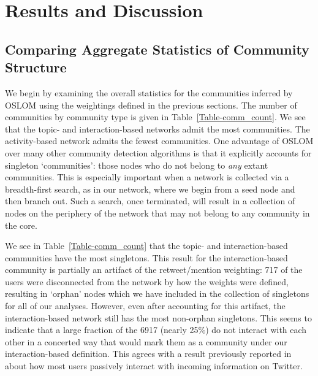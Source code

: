 \section{Results and Discussion}

\subsection{Comparing Aggregate Statistics of Community Structure}

We begin by examining the overall statistics for the communities inferred by OSLOM using the weightings defined in the previous sections. The number of communities by community type is given in Table~\ref{Table-comm_count}. We see that the topic- and interaction-based networks admit the most communities. The activity-based network admits the fewest communities.  One advantage of OSLOM over many other community detection algorithms is that it explicitly accounts for singleton `communities': those nodes who do not belong to \emph{any} extant communities. This is especially important when a network is collected via a breadth-first search, as in our network, where we begin from a seed node and then branch out. Such a search, once terminated, will result in a collection of nodes on the periphery of the network that may not belong to any community in the core.


We see in Table~\ref{Table-comm_count} that the topic- and interaction-based communities have the most singletons. This result for the interaction-based community is partially an artifact of the retweet/mention weighting: 717 of the users were disconnected from the network by how the weights were defined, resulting in `orphan' nodes which we have included in the collection of singletons for all of our analyses. However, even after accounting for this artifact, the interaction-based network still has the most non-orphan singletons. This seems to indicate that a large fraction of the 6917 (nearly 25\%) do not interact with each other in a concerted way that would mark them as a community under our interaction-based definition. This agrees with a result previously reported in~\cite{romero2011influence} about how most users passively interact with incoming information on Twitter.

